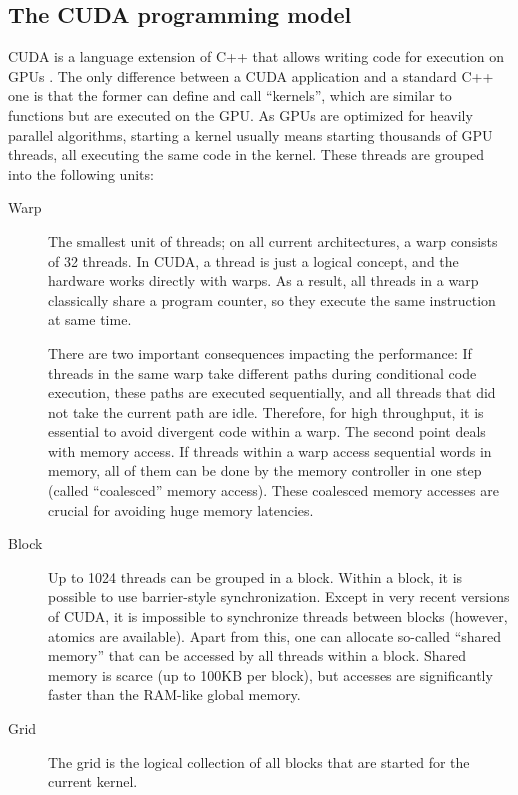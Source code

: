 \documentclass{scrartcl}
\begin{document}
    \subsection{The CUDA programming model}

    CUDA is a language extension of C++ that allows writing code for execution on GPUs \cite{cuda}. The only difference between a CUDA application and a standard C++ one is that the former can define and call ``kernels'', which are similar to functions but are executed on the GPU. As GPUs are optimized for heavily parallel algorithms, starting a kernel usually means starting thousands of GPU threads, all executing the same code in the kernel. These threads are grouped into the following units:

    \begin{description}
        \item[Warp] The smallest unit of threads; on all current architectures, a warp consists of 32 threads. In CUDA, a thread is just a logical concept, and the hardware works directly with warps. As a result, all threads in a warp classically share a program counter, so they execute the same instruction at same time. 
        
        There are two important consequences impacting the performance: If threads in the same warp take different paths during conditional code execution, these paths are executed sequentially, and all threads that did not take the current path are idle. Therefore, for high throughput, it is essential to avoid divergent code within a warp.
        The second point deals with memory access. If threads within a warp access sequential words in memory, all of them can be done by the memory controller in one step (called ``coalesced'' memory access). These coalesced memory accesses are crucial for avoiding huge memory latencies.
        
        \item[Block] Up to 1024 threads can be grouped in a block. Within a block, it is possible to use barrier-style synchronization. Except in very recent versions of CUDA, it is impossible to synchronize threads between blocks (however, atomics are available). Apart from this, one can allocate so-called ``shared memory'' that can be accessed by all threads within a block. 
        Shared memory is scarce (up to 100KB per block), but accesses are significantly faster than the RAM-like global memory.
    
        \item[Grid] The grid is the logical collection of all blocks that are started for the current kernel.
    \end{description}
\end{document}
